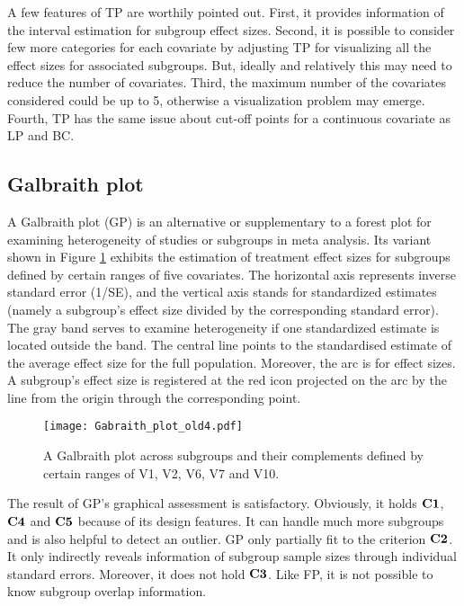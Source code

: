\documentclass[Afour,sagev,times, doublespace]{sagej}
\begin{document}
{A few features of TP are worthily pointed out. First, it provides information of the interval estimation for subgroup effect sizes. Second, it is possible to consider few more categories for each covariate by adjusting TP for visualizing all the effect sizes for associated subgroups. But, ideally and relatively this may need to reduce the number of covariates. Third, the maximum number of the covariates considered could be up to 5, otherwise a visualization problem may emerge. Fourth, TP has the same issue about cut-off points for a continuous covariate as LP and BC.

\subsection{Galbraith plot}
A Galbraith plot (GP) \cite{Galbraith:88a, Galbraith:88b} is an alternative or supplementary to a forest plot for examining heterogeneity of studies or subgroups in meta analysis.  Its variant shown in Figure \ref{fig:GP} exhibits the estimation of treatment effect sizes for subgroups defined by certain ranges of five covariates. The horizontal axis represents inverse standard error (1/SE), and the vertical axis stands for standardized estimates (namely a subgroup's effect size divided by the corresponding standard error).   The gray band serves to examine heterogeneity if one standardized estimate is located outside the band. The central line points to the standardised estimate of the average effect size for the full population. Moreover, the arc is for effect sizes. A subgroup's effect size is registered at the red icon projected on the arc by the line from the origin through the corresponding point.

\begin{figure}
\begin{center}
		\texttt{[image: Gabraith\_plot\_old4.pdf]} \\
		\caption{A Galbraith plot across subgroups and their complements defined by certain ranges of  V1, V2, V6, V7 and V10.}\label{fig:GP}
\end{center}
\end{figure}


 The result of GP's graphical assessment is satisfactory. Obviously, it holds $\bf C1$, $\bf C4$ and $\bf C5$ because of its design features. It can handle much more subgroups and is also helpful to detect an outlier. GP only partially fit to the criterion $\bf C2$. It only indirectly reveals information of subgroup sample sizes through individual standard errors. Moreover, it does not hold $\bf C3$. Like FP, it is not possible to know subgroup overlap information.

}
\end{document}

